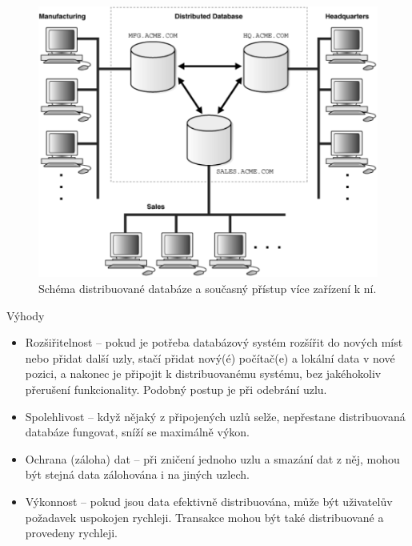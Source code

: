 \begin{figure}[!h]
  \centering
  \includegraphics[width=15cm]{template-fig/Distributed_database.pdf}
  \caption{Schéma distribuované databáze a současný přístup více zařízení k ní. \cite{distributedDBMSPic}}
  \label{FIG_DistrDB}
\end{figure}

Výhody
\begin{itemize}
\item Rozšiřitelnost – pokud je potřeba databázový systém rozšířit do nových míst nebo přidat další uzly, stačí přidat nový(é) počítač(e) a lokální data v nové pozici, a nakonec je připojit k distribuovanému systému, bez jakéhokoliv přerušení funkcionality. Podobný postup je při odebrání uzlu.

\item Spolehlivost – když nějaký z připojených uzlů selže, nepřestane distribuovaná databáze fungovat, sníží se maximálně výkon.

\item Ochrana (záloha) dat – při zničení jednoho uzlu a smazání dat z něj, mohou být stejná data zálohována i na jiných uzlech.

\item Výkonnost – pokud jsou data efektivně distribuována, může být uživatelův požadavek uspokojen rychleji. Transakce mohou být také distribuované a provedeny rychleji. 
\end{itemize}

